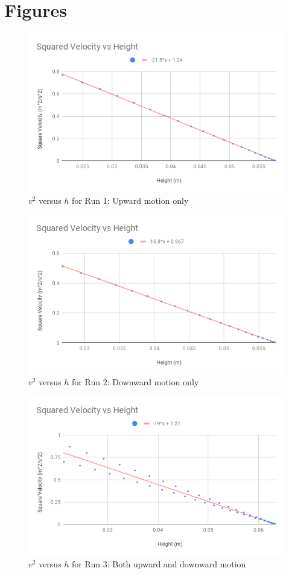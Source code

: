 \section{Figures}
%
\begin{figure}[ht]
    \centering
    \includegraphics[scale=0.71]{image/07-mechanic/v2-uphill.png}
    \caption{$v^{2}$ versus $h$ for Run 1: Upward motion only}
    \label{figure:07.v2.1}
\end{figure}
%
\begin{figure}[ht]
    \centering
    \includegraphics[scale=0.71]{image/07-mechanic/v2-downhill.png}
    \caption{$v^{2}$ versus $h$ for Run 2: Downward motion only}
    \label{figure:07.v2.2}
\end{figure}
%
\begin{figure}[ht]
    \centering
    \includegraphics[scale=0.71]{image/07-mechanic/v2-both.png}
    \caption{$v^{2}$ versus $h$ for Run 3: Both upward and downward motion}
    \label{figure:07.v2.3}
\end{figure}
